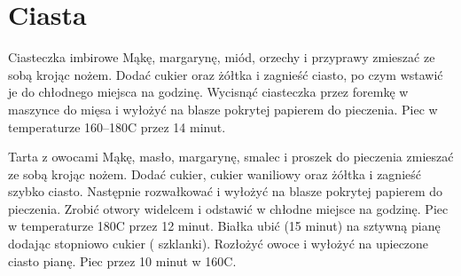 \documentclass[a4paper,12pt]{article}
\begin{document}
\tableofcontents



\newpage
\section{Ciasta}

\begin{recipe}{Ciasteczka imbirowe}{}{}
Mąkę, margarynę, miód, orzechy i przyprawy zmieszać ze sobą krojąc nożem.
Dodać cukier oraz żółtka i zagnieść ciasto, po czym wstawić je do chłodnego miejsca na godzinę.
Wycisnąć ciasteczka przez foremkę w maszynce do mięsa i wyłożyć na blasze pokrytej papierem do pieczenia. Piec w temperaturze 160--180\0C przez 14 minut.
\end{recipe}

\begin{recipe}{Tarta z owocami}{}{}
Mąkę, masło, margarynę, smalec i proszek do pieczenia zmieszać ze sobą krojąc nożem. 
Dodać cukier, cukier waniliowy oraz żółtka i zagnieść szybko ciasto. Następnie rozwałkować i wyłożyć na blasze pokrytej papierem do pieczenia. 
Zrobić otwory widelcem i odstawić w chłodne miejsce na godzinę.
Piec w temperaturze 180\0C przez 12 minut.
Białka ubić (15 minut) na sztywną pianę dodając stopniowo cukier ( szklanki). Rozłożyć owoce i wyłożyć na upieczone ciasto pianę.  Piec przez 10 minut w 160\0C.
\end{recipe}
\end{document}
